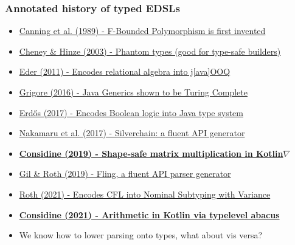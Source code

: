 \documentclass{beamer}
\begin{document}
    \begin{frame}
        \frametitle{Annotated history of typed EDSLs}
        \begin{itemize}
            \item \href{https://www.cs.utexas.edu/~wcook/papers/FBound89/CookFBound89.pdf}{Canning et al. (1989) - F-Bounded Polymorphism is first invented}
            \item \href{https://ecommons.cornell.edu/bitstream/handle/1813/5614/TR2003-1901.pdf}{Cheney \& Hinze (2003) - Phantom types (good for type-safe builders)}
            \item \href{https://jooq.org}{Eder (2011) - Encodes relational algebra into j[ava]OOQ}
            \item \href{https://arxiv.org/pdf/1605.05274.pdf}{Grigore (2016) - Java Generics shown to be Turing Complete}
            \item \href{https://github.com/erdos/java-logic}{Erdős (2017) - Encodes Boolean logic into Java type system}
            \item \href{https://dl.acm.org/doi/10.1145/3136040.3136041}{Nakamaru et al. (2017) - Silverchain: a fluent API generator}
            \item \href{http://breandan.net/public/masters_thesis.pdf#2}{\textbf{Considine (2019) - Shape-safe matrix multiplication in Kotlin$\nabla$}}
            \item \href{https://drops.dagstuhl.de/opus/volltexte/2019/10805/pdf/LIPIcs-ECOOP-2019-13.pdf}{Gil \& Roth (2019) - Fling, a fluent API parser generator}
            \item \href{https://arxiv.org/pdf/2109.03950.pdf}{Roth (2021) - Encodes CFL into Nominal Subtyping with Variance}
            \item \href{https://github.com/breandan/galoisenne}{\textbf{Considine (2021) - Arithmetic in Kotlin via typelevel abacus}}
            \item We know how to lower parsing onto types, what about vis versa?
        \end{itemize}
    \end{frame}
\end{document}

